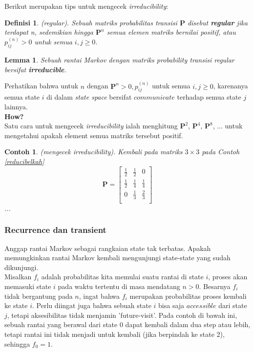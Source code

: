 \documentclass[11pt,b5paper,twoside]{book}
\newcommand{\sspace}{\textit{state space }}
\newtheorem{lemma}[section]{Lemma}
\newtheorem{definition}[theorem]{Definisi}
\newtheorem{ex}[theorem]{Contoh}
\begin{document}
	\begin{framed}\noindent
		Berikut merupakan tips untuk mengecek \textit{irreducibility}:
		
		\begin{definition} (regular). Sebuah matriks probabilitas transisi $\mathbf{P}$  disebut \textbf{regular}  jika terdapat n, sedemikian hingga $\mathbf{P}^n$ semua elemen matriks bernilai positif, atau $p_{ij}^{(n)} > 0$ untuk semua $i,j \geq 0$.
		\end{definition}
	
		\begin{lemma}
		Sebuah rantai Markov dengan matriks probability transisi regular bersifat \textbf{irreducible}.
		\end{lemma}
	
		\noindent Perhatikan bahwa untuk $n$ dengan $\mathbf{P}^n >0, p_{ij}^{(n)}$ untuk semua $i, j \geq 0$, karenanya semua state $i$ di dalam \sspace bersifat $communicate$ terhadap semua state $j$ lainnya.\\
		
	\noindent	\textbf{How?}\\
		Satu cara untuk mengecek \textit{irreducibility} ialah menghitung 	$\mathbf{P}^2$, $\mathbf{P}^4$, $\mathbf{P}^8$, ... untuk mengetahui apakah element semua matriks tersebut positif.
		
		\begin{ex} (mengecek irreducibility).
			Kembali pada matriks $3 \times 3$ pada Contoh \ref{reducibelkah}
			$$
			\mathbf{P}=
			\begin{bmatrix}
				\frac{1}{2} & \frac{1}{2} & 0 \\
				\frac{1}{2} & \frac{1}{4} & \frac{1}{4} \\
				0 & \frac{1}{3} & \frac{2}{3} \\
			\end{bmatrix}%
			$$
			...
		\end{ex}
	\end{framed}
	
		\subsubsection{Recurrence dan transient}
		\noindent Anggap rantai Markov sebagai rangkaian state tak terbatas. Apakah memungkinkan rantai Markov kembali mengunjungi state-state yang sudah dikunjungi. \\
		
		\noindent Misalkan $f_i$ adalah probabilitas kita memulai suatu rantai di state $i$, proses akan memasuki state $i$ pada waktu tertentu di masa mendatang $n>0$. Besarnya $f_i$ tidak bergantung pada $n$, ingat bahwa $f_i$ merupakan probabilitas proses kembali ke state $i$. Perlu diingat juga bahwa sebuah state $i$ bisa saja $accessible$ dari state $j$, tetapi aksesibilitas tidak menjamin 'future-visit'. Pada contoh di bawah ini, sebuah rantai yang berawal dari state 0 dapat kembali dalam dua step atau lebih, tetapi rantai ini tidak menjadi untuk kembali (jika berpindah ke state 2), sehingga $f_0 =1$. 
		
\end{document}
